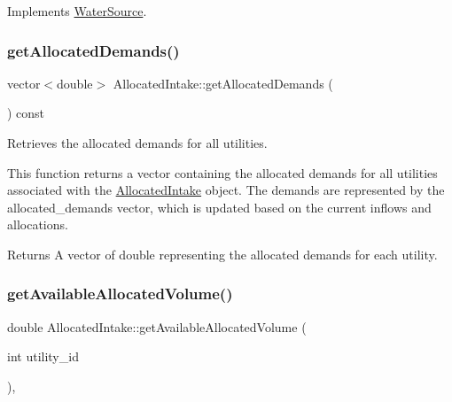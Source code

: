 Implements \mbox{\hyperlink{classWaterSource_ac070445379fe706f65b977dade4f3fbc}{Water\+Source}}.

\mbox{\label{classAllocatedIntake_a5efc6423bff0adb8c493d3c9983915ef}} 
\subsubsection{\texorpdfstring{get\+Allocated\+Demands()}{getAllocatedDemands()}}
{\footnotesize\ttfamily vector$<$double$>$ Allocated\+Intake\+::get\+Allocated\+Demands (\begin{DoxyParamCaption}{ }\end{DoxyParamCaption}) const}



Retrieves the allocated demands for all utilities. 

This function returns a vector containing the allocated demands for all utilities associated with the {\ttfamily \mbox{\hyperlink{classAllocatedIntake}{Allocated\+Intake}}} object. The demands are represented by the {\ttfamily allocated\+\_\+demands} vector, which is updated based on the current inflows and allocations.

\begin{DoxyReturn}{Returns}
A vector of {\ttfamily double} representing the allocated demands for each utility. 
\end{DoxyReturn}
\mbox{\label{classAllocatedIntake_a9c6161b8dd13b6ea70a9dafbb72afc91}} 
\subsubsection{\texorpdfstring{get\+Available\+Allocated\+Volume()}{getAvailableAllocatedVolume()}}
{\footnotesize\ttfamily double Allocated\+Intake\+::get\+Available\+Allocated\+Volume (\begin{DoxyParamCaption}\item[{int}]{utility\+\_\+id }\end{DoxyParamCaption})\hspace{0.3cm}{\ttfamily [override]}, {\ttfamily [virtual]}}




